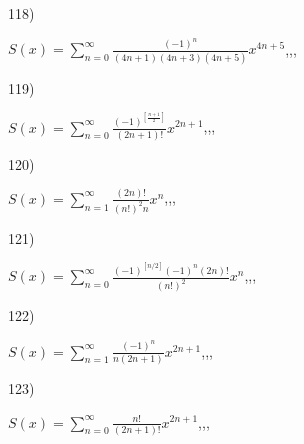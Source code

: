\documentclass[11pt, ukrainian]{article}
\begin{document}
\par
\vspace{0.9cm}
118) \space 
{%
{$S(x)=\sum\limits_{n=0}^{\infty}{\frac{(-1)^n}{(4n+1)(4n+3)(4n+5)}}{x^{{4n+5}}}$},,, \par \smallskip  
}
\par
\vspace{0.9cm}
119) \space 
{%
{$S(x)=\sum\limits_{n=0}^{\infty}{\frac{(-1)^{[\frac{n+1}{2}]}}{(2n+1)!}}{x^{{2n+1}}}$},,, \par \smallskip  
}
\par
\vspace{0.9cm}
120) \space 
{%
{$S(x)=\sum\limits_{n=1}^{\infty}{\frac{(2n)!}{{(n!)^2}n}}{x^{n}}$},,, \par \smallskip  
}
\par
\newpage
121) \space 
{%
{$S(x)=\sum\limits_{n=0}^{\infty}{\frac{{(-1)^{[n/2]}}{(-1)^n}(2n)!}{(n!)^2}}{x^{n}}$},,, \par \smallskip  
}
\par
\vspace{0.9cm}
122) \space 
{%
{$S(x)=\sum\limits_{n=1}^{\infty}{\frac{(-1)^n}{n(2n+1)}}{x^{{2n+1}}}$},,, \par \smallskip  
}
\par
\vspace{0.9cm}
123) \space 
{%
{$S(x)=\sum\limits_{n=0}^{\infty}{\frac{n!}{(2n+1)!}}{x^{{2n+1}}}$},,, \par \smallskip  
}
\end{document}
